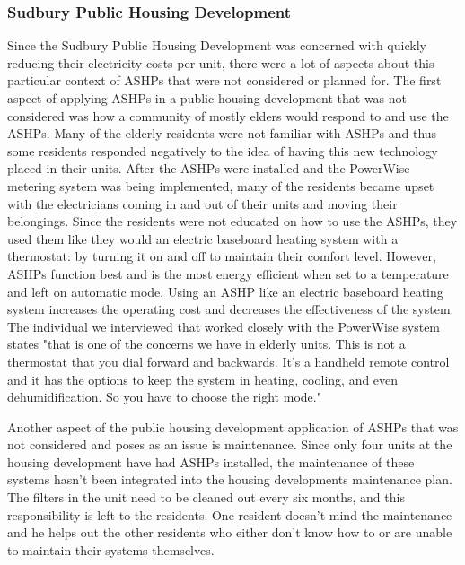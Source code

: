 \subsubsection{Sudbury Public Housing Development}
\par Since the Sudbury Public Housing Development was concerned with quickly reducing their electricity costs per unit, there were a lot of aspects about this particular context of ASHPs that were not considered or planned for. The first aspect of applying ASHPs in a public housing development that was not considered was how a community of mostly elders would respond to and use the ASHPs. Many of the elderly residents were not familiar with ASHPs and thus some residents responded negatively to the idea of having this new technology placed in their units. After the ASHPs were installed and the PowerWise metering system was being implemented, many of the residents became upset with the electricians coming in and out of their units and moving their belongings. Since the residents were not educated on how to use the ASHPs, they used them like they would an electric baseboard heating system with a thermostat: by turning it on and off to maintain their comfort level. However, ASHPs function best and is the most energy efficient when set to a temperature and left on automatic mode. Using an ASHP like an electric baseboard heating system increases the operating cost and decreases the effectiveness of the system. The individual we interviewed that worked closely with the PowerWise system states "that is one of the concerns we have in elderly units. This is not a thermostat that you dial forward and backwards. It’s a handheld remote control and it has the options to keep the system in heating, cooling, and even dehumidification. So you have to choose the right mode."
\par Another aspect of the public housing development application of ASHPs that was not considered and poses as an issue is maintenance. Since only four units at the housing development have had ASHPs installed, the maintenance of these systems hasn’t been integrated into the housing developments maintenance plan. The filters in the unit need to be cleaned out every six months, and this responsibility is left to the residents. One resident doesn’t mind the maintenance and he helps out the other residents who either don’t know how to or are unable to maintain their systems themselves.

